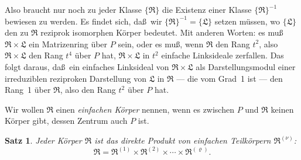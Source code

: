 \documentclass[12pt,a4paper]{article}
\theoremstyle{plain}
\newtheorem{satz}{Satz}[section]
\theoremstyle{definition}
\theoremstyle{remark}
\begin{document}
Also braucht nur noch zu jeder Klasse $\{\mathfrak{R}\}$ die Existenz einer Klasse
$\{\mathfrak{R}\}^{-1}$ bewiesen zu werden. Es findet sich, da\ss\ wir $\{\mathfrak{R}\}^{-1} = \{\mathfrak{L}\}$
setzen m\"ussen, wo $\{\mathfrak{L}\}$ den zu $\mathfrak{R}$ reziprok isomorphen K\"orper bedeutet.
Mit anderen Worten: es mu\ss\ $\mathfrak{R} \times \mathfrak{L}$ ein Matrizenring \"uber $P$ sein, oder es
mu\ss, wenn $\mathfrak{R}$ den Rang $t^{2}$, also $\mathfrak{R} \times \mathfrak{L}$ den Rang $t^{4}$ \"uber $P$ hat,
$\mathfrak{R} \times \mathfrak{L}$ in $t^{2}$ einfache Linksideale zerfallen. Das folgt daraus, da\ss\ ein
einfaches Linksideal von $\mathfrak{R} \times \mathfrak{L}$ als Darstellungsmodul einer irreduziblen
reziproken Darstellung von $\mathfrak{L}$ in $\mathfrak{R}$ --- die vom Grad~1 ist --- den Rang~1
\"uber $\mathfrak{R}$, also den Rang $t^{2}$ \"uber $P$ hat.

Wir wollen $\mathfrak{R}$ einen \textit{einfachen K\"orper} nennen, wenn es zwischen $P$ und
$\mathfrak{R}$ keinen K\"orper gibt, dessen Zentrum auch $P$ ist.

\begin{satz}
Jeder K\"orper $\mathfrak{R}$ ist das direkte Produkt von einfachen Teilk\"orpern
$\mathfrak{R}^{(\nu)}$:
\[
\mathfrak{R} = \mathfrak{R}^{(1)} \times \mathfrak{R}^{(2)} \times \cdots \times \mathfrak{R}^{(\varrho)}.
\]
\end{satz}
\end{document}
